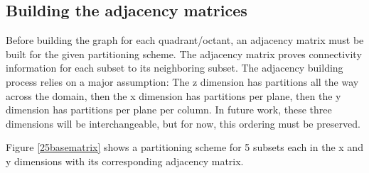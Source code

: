 \subsection{Building the adjacency matrices}

Before building the graph for each quadrant/octant, an adjacency matrix must be built for the given partitioning scheme. 
The adjacency matrix proves connectivity information for each subset to its neighboring subset. 
The adjacency building process relies on a major assumption: The z dimension has partitions all the way across the domain, then the x dimension has partitions per plane, then the y dimension has partitions per plane per column. 
In future work, these three dimensions will be interchangeable, but for now, this ordering must be preserved. 

Figure \ref{25basematrix} shows a partitioning scheme for 5 subsets each in the x and y dimensions with its corresponding adjacency matrix.

